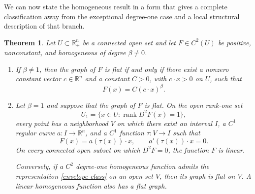 \documentclass[12pt]{amsart}
\newtheorem{theorem}{Theorem}[section]
\begin{document}
We can now state the homogeneous result in a form that gives a complete classification away from the exceptional degree-one case and a local structural description of that branch.

\begin{theorem}\label{thm:corrected-homogeneous-classification}
Let $U\subset\mathbb R_+^n$ be a connected open set and let $F\in C^2(U)$ be positive, nonconstant, and homogeneous of degree $\beta\ne0$.

\begin{enumerate}
\item If $\beta\ne1$, then the graph of $F$ is flat if and only if there exist a nonzero constant vector $c\in\mathbb R^n$ and a constant $C>0$, with $c\cdot x>0$ on $U$, such that
\begin{equation}\label{power-linear-class}
 F(x)=C(c\cdot x)^\beta.
\end{equation}

\item Let $\beta=1$ and suppose that the graph of $F$ is flat. On the open rank-one set
\[
 U_1=\{x\in U:\operatorname{rank}D^2F(x)=1\},
\]
every point has a neighborhood $V$ on which there exist an interval $I$, a $C^1$ regular curve $a:I\to\mathbb R^n$, and a $C^1$ function $\tau:V\to I$ such that
\begin{equation}\label{envelope-class}
 F(x)=a(\tau(x))\cdot x,
 \qquad
 a'(\tau(x))\cdot x=0.
\end{equation}
On every connected open subset on which $D^2F=0$, the function $F$ is linear.

Conversely, if a $C^2$ degree-one homogeneous function admits the representation \eqref{envelope-class} on an open set $V$, then its graph is flat on $V$. A linear homogeneous function also has a flat graph.
\end{enumerate}
\end{theorem}
\end{document}

